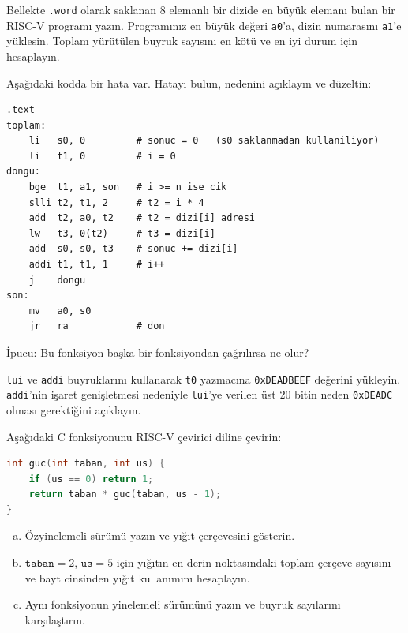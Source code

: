 \begin{alistirma}[\orta]
Bellekte \texttt{.word} olarak saklanan 8 elemanlı bir dizide en büyük elemanı bulan bir RISC-V programı yazın. Programınız en büyük değeri \texttt{a0}'a, dizin numarasını \texttt{a1}'e yüklesin. Toplam yürütülen buyruk sayısını en kötü ve en iyi durum için hesaplayın.
\end{alistirma}

\begin{alistirma}[\orta]
Aşağıdaki kodda bir hata var. Hatayı bulun, nedenini açıklayın ve düzeltin:
\begin{lstlisting}[style=riscv]
    .text
toplam:
    li   s0, 0         # sonuc = 0   (s0 saklanmadan kullaniliyor)
    li   t1, 0         # i = 0
dongu:
    bge  t1, a1, son   # i >= n ise cik
    slli t2, t1, 2     # t2 = i * 4
    add  t2, a0, t2    # t2 = dizi[i] adresi
    lw   t3, 0(t2)     # t3 = dizi[i]
    add  s0, s0, t3    # sonuc += dizi[i]
    addi t1, t1, 1     # i++
    j    dongu
son:
    mv   a0, s0
    jr   ra            # don
\end{lstlisting}
İpucu: Bu fonksiyon başka bir fonksiyondan çağrılırsa ne olur?
\end{alistirma}

\begin{alistirma}[\orta]
\texttt{lui} ve \texttt{addi} buyruklarını kullanarak \texttt{t0} yazmacına \texttt{0xDEADBEEF} değerini yükleyin. \texttt{addi}'nin işaret genişletmesi nedeniyle \texttt{lui}'ye verilen üst 20 bitin neden \texttt{0xDEADC} olması gerektiğini açıklayın.
\end{alistirma}

\begin{alistirma}[\zor]
Aşağıdaki C fonksiyonunu RISC-V çevirici diline çevirin:
\begin{lstlisting}[language=C, style=alistirma-kod]
int guc(int taban, int us) {
    if (us == 0) return 1;
    return taban * guc(taban, us - 1);
}
\end{lstlisting}
\begin{enumerate}[(a)]
\item Özyinelemeli sürümü yazın ve yığıt çerçevesini gösterin.
\item $\texttt{taban} = 2$, $\texttt{us} = 5$ için yığıtın en derin noktasındaki toplam çerçeve sayısını ve bayt cinsinden yığıt kullanımını hesaplayın.
\item Aynı fonksiyonun yinelemeli sürümünü yazın ve buyruk sayılarını karşılaştırın.
\end{enumerate}
\end{alistirma}

